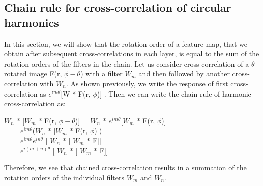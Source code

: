 \documentclass{article}
\begin{document}
\subsection{Chain rule for cross-correlation of circular harmonics}
In this section, we will show that the rotation order of a feature map, that we obtain after subsequent cross-correlations in each layer, is equal to the sum of the rotation orders of the filters in the chain.
Let us consider cross-correlation of a $\theta$ rotated image F(r, $\phi - \theta$)  with a filter $W_m$ and then followed by another cross-correlation with $W_n$. As shown previously, we write the response of first cross-correlation as  $e^{i m \theta}$[W * F(r, $\phi$)] . Then we can write the chain rule of harmonic cross-correlation as:
\vspace{-0.1cm}
\begin{center} 
$W_n$ * [$W_m$ * F(r, $\phi - \theta$)] = $W_n$ * $e^{i m \theta}$[$W_m$ * F(r, $\phi$)] \\ \vspace{0.1cm}
$\hspace{10pt}$ = $e^{i m \theta}$($W_n$ * [$W_m$ * F(r, $\phi$)])   \\ \vspace{0.1cm}
$\hspace{10pt}$ = $e^{i m \theta} e^{i n \theta}$ [ $W_n$ * [ $W_m$ * F]]  \\ \vspace{0.1cm}
$\hspace{10pt}$ = $e^{i (m + n) \theta} $ [ $W_n$ * [ $W_m$ * F]] 
\end{center}

Therefore, we see that chained cross-correlation results in a summation of the rotation orders of the individual filters $W_m$ and $W_n$.
\end{document}
